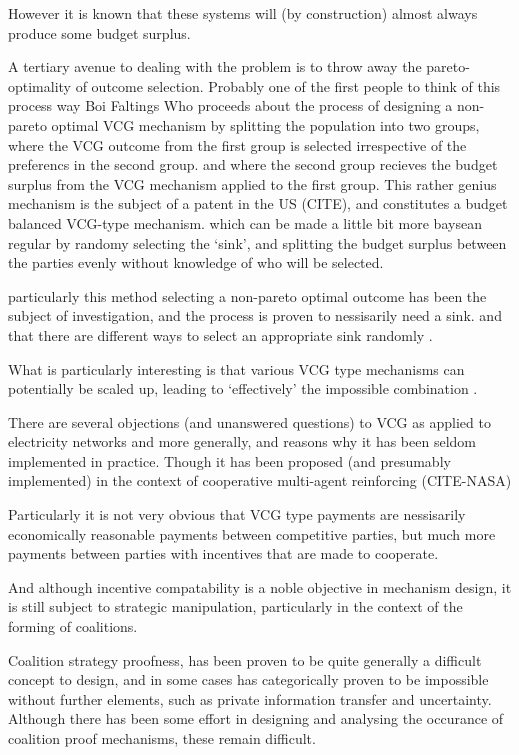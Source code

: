 \documentclass{article}
\begin{document}
However it is known that these systems will (by construction) almost always produce some budget surplus.

A tertiary avenue to dealing with the problem is to throw away the pareto-optimality of outcome selection.
Probably one of the first people to think of this process way Boi Faltings \cite{10.1007/978-3-642-25510-6_14}
Who proceeds about the process of designing a non-pareto optimal VCG mechanism by splitting the population into two groups, where the VCG outcome from the first group is selected irrespective of the preferencs in the second group.
and where the second group recieves the budget surplus from the VCG mechanism applied to the first group.
This rather genius mechanism is the subject of a patent in the US (CITE), and constitutes a budget balanced VCG-type mechanism.
which can be made a little bit more baysean regular by randomy selecting the `sink', and splitting the budget surplus between the parties evenly without knowledge of who will be selected.\cite{10.1007/978-3-642-25510-6_14}

particularly this method selecting a non-pareto optimal outcome has been the subject of investigation, and the process is proven to nessisarily need a sink.
and that there are different ways to select an appropriate sink randomly \cite{NATH2019673}.

What is particularly interesting is that various VCG type mechanisms can potentially be scaled up, leading to `effectively' the impossible combination \cite{NATH2019673}.

There are several objections (and unanswered questions) to VCG as applied to electricity networks and more generally, and reasons why it has been seldom implemented in practice.\cite{journals/ior/Rothkopf07}\cite{Ausubel2006}
Though it has been proposed (and presumably implemented) in the context of cooperative multi-agent reinforcing (CITE-NASA)

Particularly it is not very obvious that VCG type payments are nessisarily economically reasonable payments between competitive parties, but much more payments between parties with incentives that are made to cooperate.

And although incentive compatability is a noble objective in mechanism design, it is still subject to strategic manipulation, particularly in the context of the forming of coalitions.

Coalition strategy proofness, has been proven to be quite generally a difficult concept to design, and in some cases has categorically proven to be impossible \cite{10.2307/2297048} without further elements, such as private information transfer and uncertainty.
Although there has been some effort in designing and analysing the occurance of coalition proof mechanisms, these remain difficult.
\end{document}
